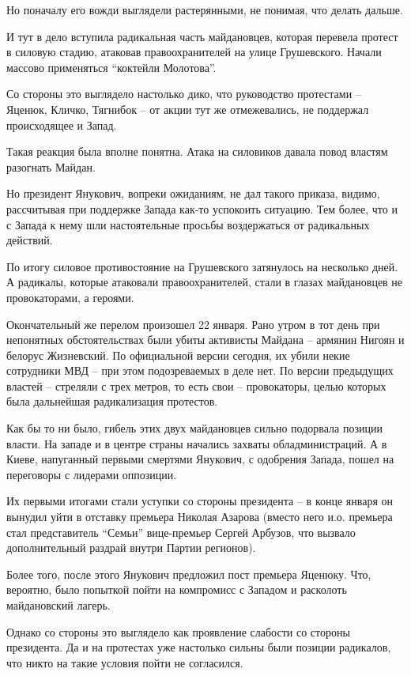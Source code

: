 Но поначалу его вожди выглядели растерянными, не понимая, что делать
дальше. 

И тут в дело вступила радикальная часть майдановцев, которая перевела
протест в силовую стадию, атаковав правоохранителей на улице Грушевского.
Начали массово применяться \enquote{коктейли Молотова}.

Со стороны это выглядело настолько дико, что руководство протестами –
Яценюк, Кличко, Тягнибок – от акции тут же отмежевались, не поддержал
происходящее и Запад.

Такая реакция была вполне понятна. Атака на силовиков давала повод властям
разогнать Майдан. 

Но президент Янукович, вопреки ожиданиям, не дал такого приказа, видимо,
рассчитывая при поддержке Запада как-то успокоить ситуацию. Тем более, что
и с Запада к нему шли настоятельные просьбы воздержаться от радикальных
действий.

По итогу силовое противостояние на Грушевского затянулось на несколько
дней. А радикалы, которые атаковали правоохранителей, стали в глазах
майдановцев не провокаторами, а героями.  

Окончательный же перелом произошел 22 января. Рано утром в тот день при
непонятных обстоятельствах были убиты активисты Майдана – армянин Нигоян и
белорус Жизневский. По официальной версии сегодня, их убили некие
сотрудники МВД – при этом подозреваемых в деле нет. По версии предыдущих
властей – стреляли с трех метров, то есть свои – провокаторы, целью
которых была дальнейшая радикализация протестов.

Как бы то ни было, гибель этих двух майдановцев сильно подорвала позиции
власти. На западе и в центре страны начались захваты обладминистраций. А в
Киеве, напуганный первыми смертями Янукович, с одобрения Запада, пошел на
переговоры с лидерами оппозиции. 

Их первыми итогами стали уступки со стороны президента – в конце января он
вынудил уйти в отставку премьера Николая Азарова (вместо него и.о.
премьера стал представитель \enquote{Семьи} вице-премьер Сергей Арбузов, что
вызвало дополнительный раздрай внутри Партии регионов). 

Более того, после этого Янукович предложил пост премьера Яценюку. Что,
вероятно, было  попыткой пойти на компромисс с Западом и расколоть
майдановский лагерь.

Однако со стороны это выглядело как проявление слабости со стороны
президента. Да и на протестах уже настолько сильны были позиции радикалов,
что никто на такие условия пойти не согласился. 

